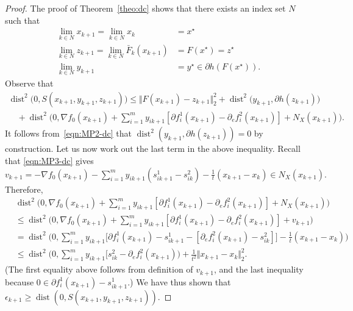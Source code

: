 \documentclass[smallextended,envcountsect]{svjour3}
\newcommand{\norm}[1]{\textstyle{\Vert} #1 \textstyle{\Vert}_2}
\DeclareMathOperator{\dist}{dist}
\begin{document}
\begin{proof}
The proof of Theorem~\ref{theo:dc} shows that there exists an index set $N$ such that
\begin{subequations}\label{eq:dc-aux2}
\begin{align}
\lim_{k\in N} x_{k+1} = \lim_{k\in N} x_{k} & = x^\star \\
\lim_{k\in N} z_{k+1} =  \lim_{k \in N} \bar F_k(x_{k+1}) & = F(x^\star)=z^\star\\
\lim_{k\in N} y_{k+1} &= y^\star \in \partial h(F(x^\star)). %
\end{align}
\end{subequations}
Observe that
\begin{align*}
\dist^2\Big(0,S(x_{k+1},y_{k+1},z_{k+1})\Big) \leq \norm{F(x_{k+1})-z_{k+1}}^2
+\dist^2\Big(y_{k+1},\partial h(z_{k+1})\Big)  \\
\quad +\dist^2\Big(0,\nabla f_0(x_{k+1})+\sum_{i=1}^my_{ik+1}[\partial f^1_i(x_{k+1})-\partial_{e} f^2_i(x_{k+1})]+N_X(x_{k+1})\Big).
\end{align*}
It follows from~\eqref{eqn:MP2-dc} that $\dist^2(y_{k+1},\partial h(z_{k+1})) =0$ by construction.  
 Let us now work out the last term in the above inequality. Recall that \eqref{eqn:MP3-dc} gives
$
v_{k+1}=-\nabla f_0(x_{k+1}) - \sum_{i=1}^m y_{ik+1} (s^1_{ik+1}-s^2_{ik})-\frac{1}{t}(x_{k+1}-x_k)  \in N_X(x_{k+1}).
$
Therefore,
  \begin{align*}
&\dist^2\Big(0,\nabla f_0(x_{k+1})+\sum_{i=1}^my_{ik+1}[\partial f^1_i(x_{k+1})-\partial_{e} f^2_i(x_{k+1})]+N_X(x_{k+1})\Big)\\
&\leq\dist^2\Big(0,\nabla f_0(x_{k+1})+\sum_{i=1}^my_{ik+1}[\partial f^1_i(x_{k+1})-\partial_{e} f^2_i(x_{k+1})]+v_{k+1}\Big)\\
&=\dist^2\Big(0,\sum_{i=1}^my_{ik+1}\big[\partial f^1_i(x_{k+1})-s^1_{ik+1}-[\partial_{e}f^2_i(x_{k+1})-s^2_{ik}]\big]-\frac{1}{t}(x_{k+1}-x_k)\Big)\\
&\leq \dist^2\Big(0,\sum_{i=1}^my_{ik+1}[s^2_{ik} -\partial_{e} f^2_i(x_{k+1})\Big)+\frac{1}{t^2}\norm{x_{k+1}-x_k}^2.
\end{align*} 
(The first equality above follows from definition of $v_{k+1}$, and the last inequality because $0 \in \partial f^1_i(x_{k+1})-s^1_{ik+1}$.)
We have thus shown that
$\epsilon_{k+1} \geq  \dist(0,S(x_{k+1},y_{k+1},z_{k+1}))$. 


\end{proof}
\end{document}
